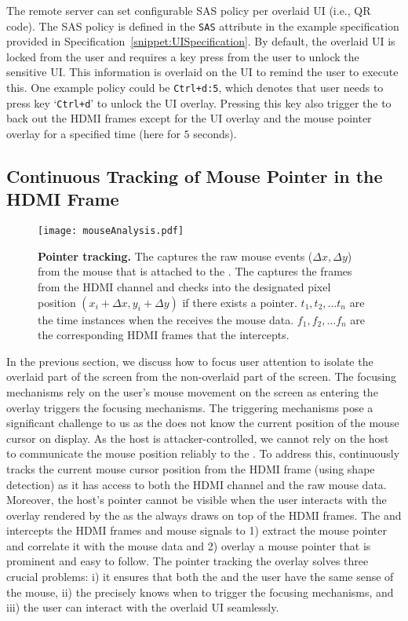  The remote server can set configurable SAS policy per overlaid UI (i.e., QR code). The SAS policy is defined in the \texttt{SAS} attribute in the example specification provided in Specification~\ref{snippet:UISpecification}. By default, the overlaid UI is locked from the user and requires a key press from the user to unlock the sensitive UI. This information is overlaid on the UI to remind the user to execute this. One example policy could be \texttt{Ctrl+d:5}, which denotes that user needs to press key `\texttt{Ctrl+d}' to unlock the UI overlay. Pressing this key also trigger the \device to back out the HDMI frames except for the UI overlay and the mouse pointer overlay for a specified time (here for $5$ seconds). 

\subsection{Continuous Tracking of Mouse Pointer in the HDMI Frame}
\label{sec:systemDesign:analysis}


\begin{figure}[t]
\centering
\texttt{[image: mouseAnalysis.pdf]}
\caption{\textbf{Pointer tracking.} \one The \device captures the raw mouse events ($\Delta x, \Delta y$) from the mouse that is attached to the \device. \two The \device captures the frames from the HDMI channel and checks into the designated pixel position $(x_i + \Delta x, y_i + \Delta y)$ if there exists a pointer. $t_1, t_2,\ldots t_n$ are the time instances when the \device receives the mouse data. $f_1, f_2,\ldots f_n$ are the corresponding HDMI frames that the \device intercepts.}
\spacesave
\label{fig:mouseAnalysis}
\centering
\end{figure}


In the previous section, we discuss how to focus user attention to isolate the overlaid part of the screen from the non-overlaid part of the screen. The focusing mechanisms rely on the user's mouse movement on the screen as entering the overlay triggers the focusing mechanisms. The triggering mechanisms pose a significant challenge to us as the \device does not know the current position of the mouse cursor on display. As the host is attacker-controlled, we cannot rely on the host to communicate the mouse position reliably to the \device. To address this, \name continuously tracks the current mouse cursor position from the HDMI frame (using shape detection) as it has access to both the HDMI channel and the raw mouse data.
Moreover, the host's pointer cannot be visible when the user interacts with the overlay rendered by the \device as the \device always draws on top of the HDMI frames. The \device and intercepts the HDMI frames and mouse signals to 1) extract the mouse pointer and correlate it with the mouse data and 2) overlay a mouse pointer that is prominent and easy to follow. The pointer tracking the overlay solves three crucial problems: i) it ensures that both the \device and the user have the same sense of the mouse, ii) the \device precisely knows when to trigger the focusing mechanisms, and iii) the user can interact with the overlaid UI seamlessly. 


